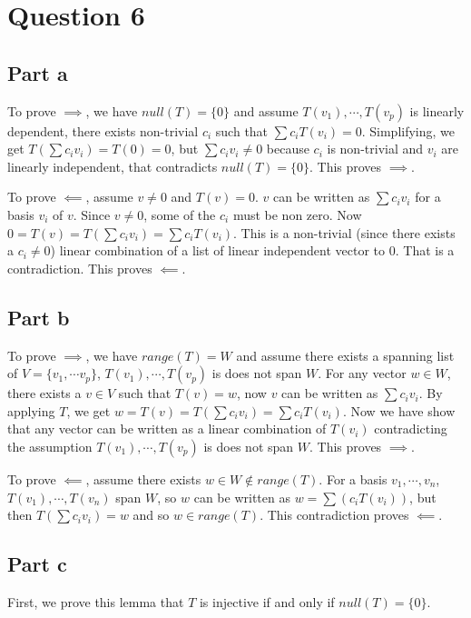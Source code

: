 \section*{Question 6}
\subsection*{Part a}
To prove $ \implies $, we have $ null(T) = \{0\} $ and assume $ T(v_1), \cdots  , T(v_p) $ is linearly dependent, there exists non-trivial $ c_i $ such that $ \sum c_i T(v_i) = 0 $. Simplifying, we get $ T(\sum c_i v_i) = T(0) = 0 $, but $ \sum c_i v_i \ne 0 $ because $ c_i $ is non-trivial and $ v_i $ are linearly independent, that contradicts $ null(T) = \{0\} $. This proves $ \implies $.

To prove $ \impliedby $, assume $ v \ne 0 $ and $ T(v) = 0 $.  $ v $ can be written as $ \sum c_i v_i $ for a basis $ v_i $ of $ v $. Since $ v \ne 0 $, some of the $ c_i $ must be non zero. Now $ 0 = T(v) = T(\sum c_i v_i) = \sum c_i T(v_i) $. This is a non-trivial (since there exists a $ c_i \ne 0 $) linear combination of a list of linear independent vector to 0. That is a contradiction. This proves $ \impliedby $.

\subsection*{Part b}
To prove $ \implies $, we have $ range(T) = W $ and assume there exists a spanning list of $ V = \{v_1, \cdots v_p\}$, $ T(v_1), \cdots , T(v_p) $ is does not span $ W $. For any vector $ w \in W $, there exists a $ v \in V $ such that $ T(v) = w $, now $ v $ can be written as $ \sum c_i v_i $. By applying $ T $, we get $ w = T(v) = T(\sum c_i v_i) = \sum c_i T(v_i) $. Now we have show that any vector can be written as a linear combination of $ T(v_i) $ contradicting the assumption $ T(v_1), \cdots , T(v_p) $ is does not span $ W $. This proves $ \implies $.

To prove $ \impliedby $, assume there exists $ w \in W \notin range(T) $. For a basis $ v_1, \cdots , v_n $, $ T(v_1), \cdots , T(v_n) $ span $ W $, so $ w $ can be written as $ w = \sum(c_i T(v_i)) $, but then $ T(\sum c_i v_i) = w $ and so $ w \in range(T) $. This contradiction proves $ \impliedby $.

\subsection*{Part c}
First, we prove this lemma that $ T$ is injective if and only if $ null(T) = \{0\} $.

